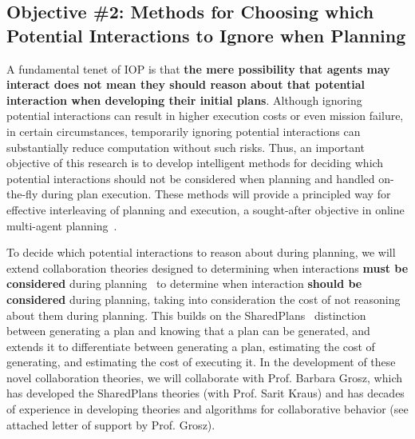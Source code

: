 \documentclass[11pt]{article}
\begin{document}

\subsection{Objective \#2: Methods for Choosing which Potential Interactions to Ignore when Planning}

A fundamental tenet of IOP is that {\bf the mere possibility that agents may interact does not mean they should reason about that potential interaction when developing their initial plans}. Although ignoring potential interactions can result in higher execution costs or even mission failure, in certain circumstances, temporarily ignoring potential interactions can substantially reduce computation without such risks. Thus, an important objective of this research is to develop intelligent methods for deciding which potential interactions should not be considered when planning and handled on-the-fly during plan execution. These methods will provide a principled way for effective interleaving of planning and execution, a sought-after objective in online multi-agent planning~\cite{roth2007exploiting,wu2011online,kwak2011teamwork}. 


To decide which potential interactions to reason about during planning, we will extend collaboration theories designed to determining when interactions {\bf must be considered} during planning~\cite{grosz1996collaborative} to determine when interaction {\bf should be considered} during planning, taking into consideration the cost of not reasoning about them during planning. This builds on the SharedPlans~\cite{grosz1996collaborative} distinction between generating a plan and knowing that a plan can be generated, and extends it to differentiate between generating a plan, estimating the cost of generating, and estimating the cost of executing it. In the development of these novel collaboration theories, we will collaborate with Prof. Barbara Grosz, which has developed the SharedPlans theories (with Prof. Sarit Kraus) and has decades of experience in developing theories and algorithms for collaborative behavior (see attached letter of support by Prof. Grosz). 


\end{document}
